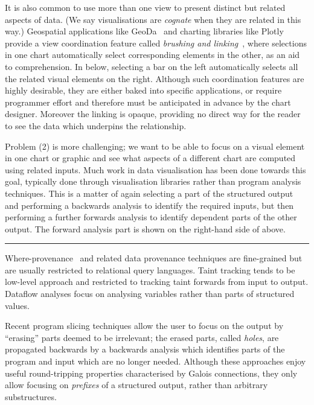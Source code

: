 It is also common to use more than one view to present distinct but related aspects of data. (We say visualisations are \emph{cognate} when they are related in this way.) Geospatial applications like GeoDa~\cite{anselin06} and charting libraries like Plotly provide a view coordination feature called \emph{brushing and linking}~\cite{becker87}, where selections in one chart automatically select corresponding elements in the other, as an aid to comprehension. In  below, selecting a bar on the left automatically selects all the related visual elements on the right. Although such coordination features are highly desirable, they are either baked into specific applications, or require programmer effort and therefore must be anticipated in advance by the chart designer. Moreover the linking is opaque, providing no direct way for the reader to see the data which underpins the relationship.

Problem (2) is more challenging; we want to be able to focus on a visual element in one chart or graphic and see what aspects of a different chart are computed using related inputs. Much work in data visualisation has been done towards this goal, typically done through visualisation libraries rather than program analysis techniques. This is a matter of again selecting a part of the structured output and performing a backwards analysis to identify the required inputs, but then performing a further forwards analysis to identify dependent parts of the other output. The forward analysis part is shown on the right-hand side of  above.

\hrule

Where-provenance~\cite{buneman01} and related data provenance techniques are fine-grained but are usually restricted to relational query languages. Taint tracking \cite{newsome05} tends to be low-level approach and restricted to tracking taint forwards from input to output. Dataflow analyses \cite{reps95} focus on analysing variables rather than parts of structured values.

Recent program slicing techniques \cite{perera12a,perera13a,ricciotti17} allow the user to focus on the output by ``erasing'' parts deemed to be irrelevant; the erased parts, called \emph{holes}, are propagated backwards by a backwards analysis which identifies parts of the program and input which are no longer needed. Although these approaches enjoy useful round-tripping properties characterised by Galois connections, they only allow focusing on \emph{prefixes} of a structured output, rather than arbitrary substructures.

